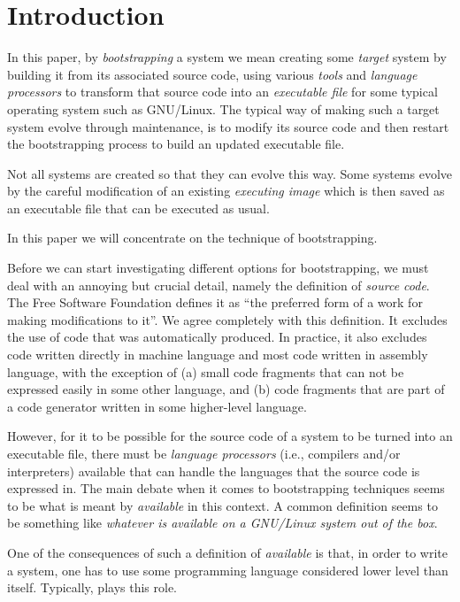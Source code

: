 \section{Introduction}
\label{sec-introduction}

In this paper, by \emph{bootstrapping} a \commonlisp{} system we mean
creating some \emph{target} \commonlisp{} system by building it from
its associated source code, using various \emph{tools} and
\emph{language processors} to transform that source code into an
\emph{executable file} for some typical operating system such as
GNU/Linux.  The typical way of making such a target \commonlisp{}
system evolve through maintenance, is to modify its source code and
then restart the bootstrapping process to build an updated executable
file.

Not all \commonlisp{} systems are created so that they can evolve this
way.  Some systems evolve by the careful modification of an existing
\emph{executing image} which is then saved as an executable file that
can be executed as usual.

In this paper we will concentrate on the technique of bootstrapping.

Before we can start investigating different options for bootstrapping,
we must deal with an annoying but crucial detail, namely the
definition of \emph{source code}.  The Free Software Foundation
defines it as ``the preferred form of a work for making modifications
to it''.  We agree completely with this definition.  It excludes the
use of code that was automatically produced.  In practice, it also
excludes code written directly in machine language and most code
written in assembly language, with the exception of (a) small code
fragments that can not be expressed easily in some other language, and
(b) code fragments that are part of a code generator written in some
higher-level language.

However, for it to be possible for the source code of a \commonlisp{}
system to be turned into an executable file, there must be
\emph{language processors} (i.e., compilers and/or interpreters)
available that can handle the languages that the source code is
expressed in.  The main debate when it comes to bootstrapping
techniques seems to be what is meant by \emph{available} in this
context.  A common definition seems to be something like
\emph{whatever is available on a GNU/Linux system out of the box}.

One of the consequences of such a definition of \emph{available} is
that, in order to write a \commonlisp{} system, one has to use
some programming language considered lower level than \commonlisp{}
itself.  Typically, \clanguage{} plays this role.


